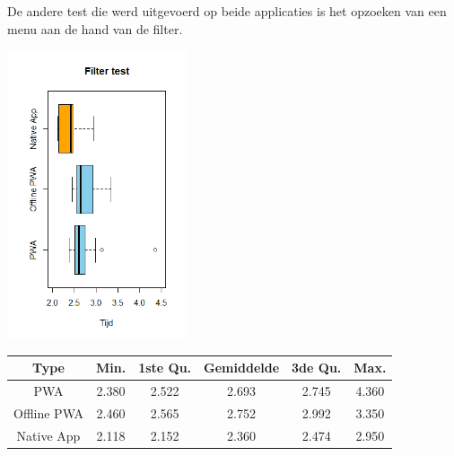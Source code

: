 \documentclass[a0,portrait]{a0poster}
\begin{document}
\begin{multicols}{2}
De andere test die werd uitgevoerd op beide applicaties is het opzoeken van een menu aan de hand van de filter.
\begin{center}
	\includegraphics[width=200px]{Rplot_Filter_AllType}
\end{center}

\begin{center}
		\centering
	\begin{tabular}{|c|c|c|c|c|c|}
		\hline
		Type        & Min.  & 1ste Qu. & Gemiddelde & 3de Qu. & Max.  \\
		\hline
		PWA         & 2.380 & 2.522    & 2.693      & 2.745   & 4.360 \\
		\hline
		Offline PWA & 2.460 & 2.565    & 2.752      & 2.992   & 3.350 \\
		\hline
		Native App  & 2.118 & 2.152    & 2.360      & 2.474   & 2.950 \\
		\hline
	\end{tabular}
\end{center}


\end{multicols}
\end{document}
